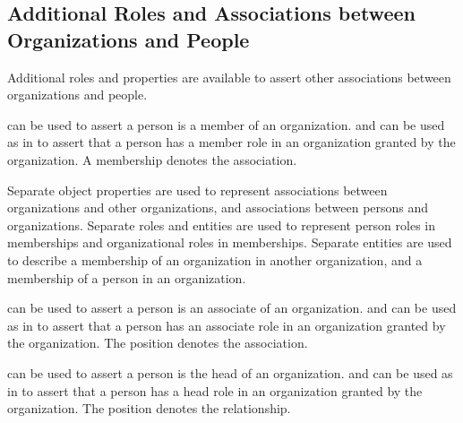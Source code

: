 \documentclass[letterpaper,10pt,english]{sphinxmanual}
\begin{document}
\subsection{Additional Roles and Associations between Organizations and People}
\label{\detokenize{associations:additional-roles-and-associations-between-organizations-and-people}}
\sphinxAtStartPar
Additional roles and properties are available to assert other associations
between organizations and people.

\sphinxAtStartPar
{} can be used to assert a person is a member of an
organization.   and
 can be used as in {\hyperref[\detokenize{associations:figure-5}]{}} to assert
that a person has a member role in an organization granted by the organization.
A membership denotes the association.

\begin{sphinxShadowBox}

\sphinxAtStartPar
Separate object properties are used to represent associations between organizations
and other organizations, and associations between persons and organizations.  Separate
roles and entities
are used to represent person roles in memberships and organizational roles in
memberships.  Separate entities are used to describe a membership of an
organization in another organization, and a membership of a person in an
organization.
\end{sphinxShadowBox}

\sphinxAtStartPar
{} can be used to assert a person is an associate of an
organization.   and
 can be used as in {\hyperref[\detokenize{associations:figure-5}]{}} to assert
that a person has an associate role in an organization granted by the organization.
The position denotes the association.

\sphinxAtStartPar
{} can be used to assert a person is the head of an
organization.   and
 can be used as in {\hyperref[\detokenize{associations:figure-5}]{}} to assert
that a person has a head role in an organization granted by the organization.
The position denotes the relationship.
\end{document}

